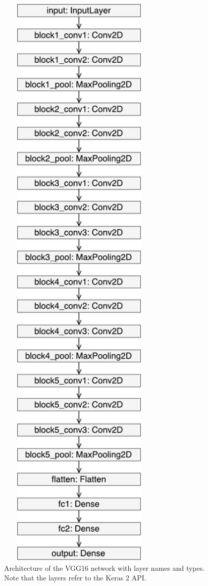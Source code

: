 \begin{figure}
\begin{minipage}{0.4\textwidth}
            \includegraphics[width=0.7\textwidth]{fig/vgg_keras.pdf}
            \caption{Architecture of the VGG16 network with layer names and types. Note that the layers refer to the Keras 2 API.}
            \label{vgg:architecture}
    \end{minipage}
\end{figure}

